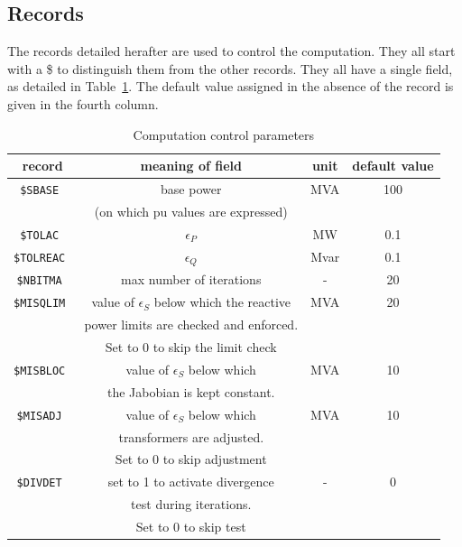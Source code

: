 \subsection{Records}

The records detailed herafter are used to control the computation. They all start with a \$ to distinguish them from the other records. They all have a single field, as detailed in Table~\ref{tab-control-param}. The default value assigned in the absence of the record is given in the fourth column.

\begin{table}[h!]
\centering
\caption{Computation control parameters}\label{tab-control-param}
\begin{tabular}{|c|c|c|c|}
\hline
record & meaning of field & unit & default value \\
\hline \hline
\tt \$SBASE   & base power  & MVA & 100 \\
              & (on which pu values are expressed) & & \\ \hline
\tt \$TOLAC   & $\epsilon_P$ & MW & 0.1 \\ \hline
\tt \$TOLREAC & $\epsilon_Q$ & Mvar & 0.1 \\ \hline
\tt \$NBITMA  & max number of iterations & - & 20 \\ \hline
\tt \$MISQLIM & value of $\epsilon_S$ below which the reactive & MVA & 20 \\
              & power limits are checked and enforced. &     & \\ 
              & Set to 0 to skip the limit check & & \\ \hline
\tt \$MISBLOC & value of $\epsilon_S$ below which & MVA & 10 \\ 
              & the Jabobian is kept constant. & & \\ \hline

\tt \$MISADJ  & value of $\epsilon_S$ below which & MVA & 10 \\
              & transformers are adjusted. & & \\ 
              & Set to 0 to skip adjustment & & \\ \hline
\tt \$DIVDET  & set to 1 to activate divergence & - & 0 \\
              & test during iterations.  & & \\ 
              & Set to 0 to skip test & & \\ \hline
\end{tabular}
\end{table}

\clearpage

